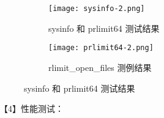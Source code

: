 \begin{figure}[H]
    \centering  %
    \begin{subfigure}[t]{0.45\textwidth}
        \centering
        \texttt{[image: sysinfo-2.png]}
        \caption{sysinfo 和 prlimit64 测试结果}
        \label{fig:sysinfo-test}
    \end{subfigure}
    \hfill %
    \begin{subfigure}[t]{0.45\textwidth}
        \centering
        \texttt{[image: prlimit64-2.png]}
        \caption{rlimit\_open\_files 测例结果}
        \label{fig:prlimit64-test}
    \end{subfigure}
    \caption{sysinfo 和 prlimit64 测试结果}
    \label{Fig.main3}
\end{figure}



【4】性能测试：



